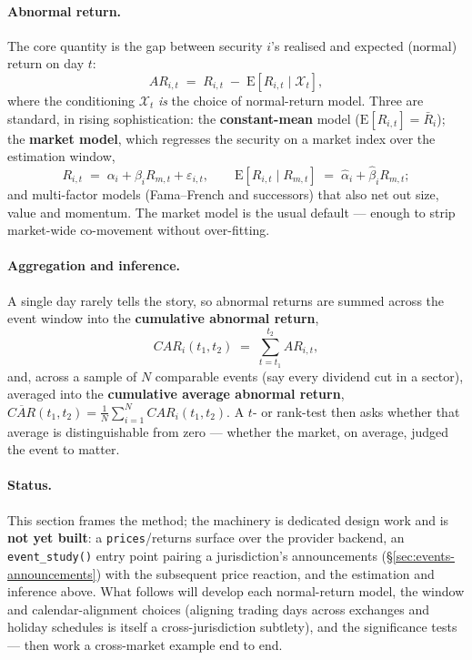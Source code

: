 \documentclass[11pt,a4paper]{report}
\begin{document}
\paragraph{Abnormal return.} The core quantity is the gap between security $i$'s realised and expected
(normal) return on day $t$:
\[
  AR_{i,t} \;=\; R_{i,t} \;-\; \mathrm{E}\!\left[R_{i,t} \mid \mathcal{X}_t\right],
\]
where the conditioning $\mathcal{X}_t$ \emph{is} the choice of normal-return model. Three are standard, in
rising sophistication: the \textbf{constant-mean} model ($\mathrm{E}[R_{i,t}] = \bar{R}_i$); the
\textbf{market model}, which regresses the security on a market index over the estimation window,
\[
  R_{i,t} \;=\; \alpha_i + \beta_i R_{m,t} + \varepsilon_{i,t}, \qquad
  \mathrm{E}\!\left[R_{i,t}\mid R_{m,t}\right] \;=\; \hat{\alpha}_i + \hat{\beta}_i R_{m,t};
\]
and multi-factor models (Fama--French and successors) that also net out size, value and momentum. The market
model is the usual default --- enough to strip market-wide co-movement without over-fitting.

\paragraph{Aggregation and inference.} A single day rarely tells the story, so abnormal returns are summed
across the event window into the \textbf{cumulative abnormal return},
\[
  CAR_i(t_1,t_2) \;=\; \sum_{t=t_1}^{t_2} AR_{i,t},
\]
and, across a sample of $N$ comparable events (say every dividend cut in a sector), averaged into the
\textbf{cumulative average abnormal return}, $\overline{CAR}(t_1,t_2) = \tfrac{1}{N}\sum_{i=1}^{N}
CAR_i(t_1,t_2)$. A $t$- or rank-test then asks whether that average is distinguishable from zero --- whether
the market, on average, judged the event to matter.

\paragraph{Status.} This section frames the method; the machinery is dedicated design work and is
\textbf{not yet built}: a \texttt{prices}/returns surface over the provider backend, an
\texttt{event\_study()} entry point pairing a jurisdiction's announcements (\S\ref{sec:events-announcements})
with the subsequent price reaction, and the estimation and inference above. What follows will develop each
normal-return model, the window and calendar-alignment choices (aligning trading days across exchanges and
holiday schedules is itself a cross-jurisdiction subtlety), and the significance tests --- then work a
cross-market example end to end.
\end{document}
